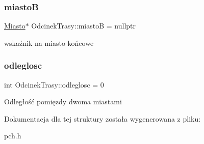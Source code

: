 \subsubsection{\texorpdfstring{miastoB}{miastoB}}
{\footnotesize\ttfamily \mbox{\hyperlink{struct_miasto}{Miasto}}$\ast$ Odcinek\+Trasy\+::miastoB = nullptr}

wskaźnik na miasto końcowe \mbox{\label{struct_odcinek_trasy_aa32dc6880fd7a9ed73d32d3f7c7f7e70}} 
\subsubsection{\texorpdfstring{odleglosc}{odleglosc}}
{\footnotesize\ttfamily int Odcinek\+Trasy\+::odleglosc = 0}

Odległość pomięzdy dwoma miastami 

Dokumentacja dla tej struktury została wygenerowana z pliku\+:\begin{DoxyCompactItemize}
\item 
pch.\+h\end{DoxyCompactItemize}
